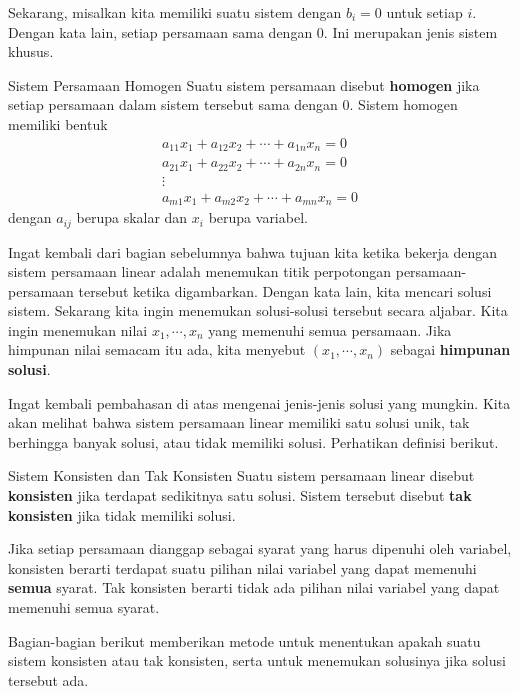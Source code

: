Sekarang, misalkan kita memiliki suatu sistem dengan $b_{i} = 0$ untuk setiap $i$. Dengan kata lain, setiap
persamaan sama dengan $0$. Ini merupakan jenis sistem khusus.

\begin{definition}{Sistem Persamaan Homogen}\label{def:homogeneoussystem}
Suatu sistem persamaan disebut \textbf{homogen}  jika setiap persamaan dalam
sistem tersebut sama dengan $0$. Sistem homogen memiliki bentuk
\begin{equation*}
\begin{array}{c}
a_{11}x_{1}+a_{12}x_{2}+\cdots +a_{1n}x_{n}= 0 \\
a_{21}x_{1}+a_{22}x_{2}+\cdots +a_{2n}x_{n}= 0  \\
\vdots \\
a_{m1}x_{1}+a_{m2}x_{2}+\cdots +a_{mn}x_{n}= 0 
\end{array}
\end{equation*}
dengan $a_{ij}$ berupa skalar dan $x_{i}$ berupa variabel.
\end{definition}

Ingat kembali dari bagian sebelumnya bahwa tujuan kita ketika bekerja dengan sistem persamaan linear
adalah menemukan titik perpotongan persamaan-persamaan tersebut ketika digambarkan. Dengan kata lain, kita
mencari solusi sistem. Sekarang kita ingin menemukan solusi-solusi tersebut secara aljabar. Kita ingin menemukan nilai
$ x_{1},\cdots ,x_{n} $ yang memenuhi semua
persamaan. Jika himpunan nilai semacam itu ada, kita menyebut $\left( x_{1},\cdots ,x_{n}\right)$ sebagai \textbf{himpunan solusi}. 

Ingat kembali pembahasan di atas mengenai jenis-jenis solusi yang mungkin.
Kita akan melihat bahwa sistem persamaan linear memiliki satu solusi unik, tak berhingga banyak solusi,
atau tidak memiliki solusi. Perhatikan definisi berikut.

\begin{definition}{Sistem Konsisten dan Tak Konsisten}\label{def:consistentandinconsistent}
Suatu sistem persamaan linear disebut
 \textbf{konsisten} jika terdapat sedikitnya satu solusi. Sistem tersebut
disebut
 \textbf{tak konsisten} jika tidak memiliki solusi.
\end{definition}

Jika setiap persamaan dianggap sebagai syarat yang harus
dipenuhi oleh variabel, konsisten berarti terdapat suatu pilihan nilai
variabel yang dapat memenuhi \textbf{semua} syarat. Tak konsisten berarti
tidak ada pilihan nilai variabel yang dapat memenuhi semua syarat.

Bagian-bagian berikut memberikan metode untuk menentukan apakah suatu sistem konsisten atau tak konsisten, serta untuk menemukan
solusinya jika solusi tersebut ada.
